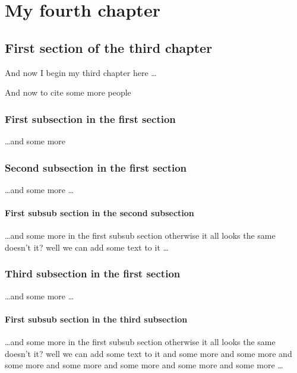 \chapter{My fourth chapter}

\ifpdf
    \graphicspath{{Chapter4/Figs/Raster/}{Chapter4/Figs/PDF/}{Chapter4/Figs/}}
\else
    \graphicspath{{Chapter4/Figs/Vector/}{Chapter4/Figs/}}
\fi

\section{First section of the third chapter}
And now I begin my third chapter here \dots

And now to cite some more people~\citep{Rea85,Ancey1996}

\subsection{First subsection in the first section}
\dots and some more 

\subsection{Second subsection in the first section}
\dots and some more \dots

\subsubsection{First subsub section in the second subsection}
\dots and some more in the first subsub section otherwise it all looks the same
doesn't it? well we can add some text to it \dots

\subsection{Third subsection in the first section}
\dots and some more \dots

\subsubsection{First subsub section in the third subsection}
\dots and some more in the first subsub section otherwise it all looks the same
doesn't it? well we can add some text to it and some more and some more and
some more and some more and some more and some more and some more \dots

